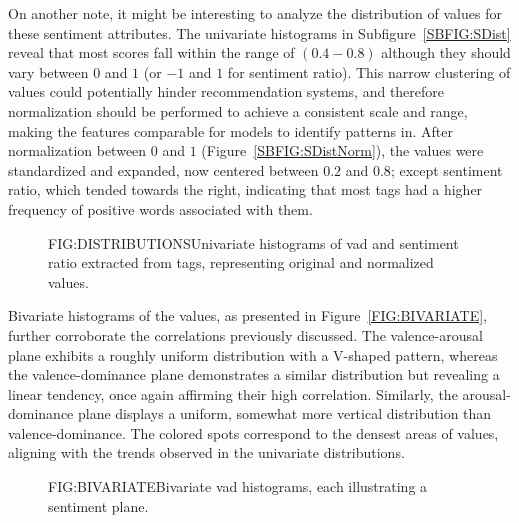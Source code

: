 On another note, it might be interesting to analyze the distribution of values for these sentiment attributes. The univariate histograms in Subfigure~\ref{SBFIG:SDist} reveal that most scores fall within the range of $(0.4 - 0.8)$ although they should vary between $0$ and $1$ (or $-1$ and $1$ for sentiment ratio). This narrow clustering of values could potentially hinder recommendation systems, and therefore normalization should be performed to achieve a consistent scale and range, making the features comparable for models to identify patterns in. After normalization between $0$ and $1$ (Figure~\ref{SBFIG:SDistNorm}), the values were standardized and expanded, now centered between $0.2$ and $0.8$; except sentiment ratio, which tended towards the right, indicating that most tags had a higher frequency of positive words associated with them.

\begin{figure}[Univariate histograms of sentiment attributes]{FIG:DISTRIBUTIONS}{Univariate histograms of \acs{vad} and sentiment ratio extracted from tags, representing original and normalized values.}
    \begin{subfigure}[SBFIG:SDist]{Original values}{}
    \end{subfigure}
    \begin{subfigure}[SBFIG:SDistNorm]{Normalized values}{}
    \end{subfigure}
\end{figure}

Bivariate histograms of the values, as presented in Figure~\ref{FIG:BIVARIATE}, further corroborate the correlations previously discussed. The valence-arousal plane exhibits a roughly uniform distribution with a V-shaped pattern, whereas the valence-dominance plane demonstrates a similar distribution but revealing a linear tendency, once again affirming their high correlation. Similarly, the arousal-dominance plane displays a uniform, somewhat more vertical distribution than valence-dominance. The colored spots correspond to the densest areas of values, aligning with the trends observed in the univariate distributions.

\begin{figure}[Bivariate histograms of valence, arousal and dominance]{FIG:BIVARIATE}{Bivariate \acs{vad} histograms, each illustrating a sentiment plane.}
\end{figure}